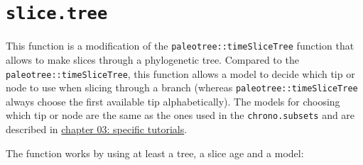 \documentclass[
]{book}
\newenvironment{Shaded}{\begin{snugshade}}{\end{snugshade}}
\newcommand{\CommentTok}[1]{\textcolor[rgb]{0.56,0.35,0.01}{\textit{#1}}}
\newcommand{\DataTypeTok}[1]{\textcolor[rgb]{0.13,0.29,0.53}{#1}}
\newcommand{\DecValTok}[1]{\textcolor[rgb]{0.00,0.00,0.81}{#1}}
\newcommand{\FloatTok}[1]{\textcolor[rgb]{0.00,0.00,0.81}{#1}}
\newcommand{\KeywordTok}[1]{\textcolor[rgb]{0.13,0.29,0.53}{\textbf{#1}}}
\newcommand{\NormalTok}[1]{#1}
\newcommand{\OperatorTok}[1]{\textcolor[rgb]{0.81,0.36,0.00}{\textbf{#1}}}
\newcommand{\StringTok}[1]{\textcolor[rgb]{0.31,0.60,0.02}{#1}}
\begin{document}
\hypertarget{slice.tree}{%
\section{\texorpdfstring{\texttt{slice.tree}}{slice.tree}}\label{slice.tree}}

This function is a modification of the \texttt{paleotree::timeSliceTree} function that allows to make slices through a phylogenetic tree.
Compared to the \texttt{paleotree::timeSliceTree}, this function allows a model to decide which tip or node to use when slicing through a branch (whereas \texttt{paleotree::timeSliceTree} always choose the first available tip alphabetically).
The models for choosing which tip or node are the same as the ones used in the \texttt{chrono.subsets} and are described in \protect\hyperlink{chrono-subsets}{chapter 03: specific tutorials}.

The function works by using at least a tree, a slice age and a model:

\begin{Shaded}
\end{Shaded}
\end{document}
